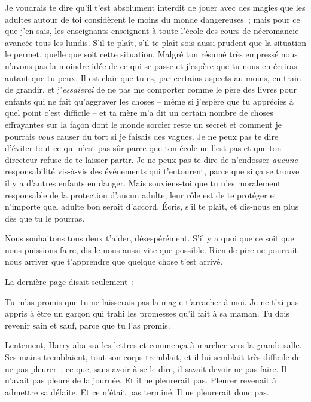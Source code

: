 \begin{writtenNote}
Je voudrais te dire qu'il t'est absolument interdit de jouer avec des magies que les adultes autour de toi considèrent le moins du monde dangereuses~; mais pour ce que j'en sais, les enseignants enseignent à toute l'école des cours de nécromancie avancée tous les lundis. S'il te plaît, s'il te plaît sois aussi prudent que la situation le permet, quelle que soit cette situation. Malgré ton résumé très empressé nous n'avons pas la moindre idée de ce qui se passe et j'espère que tu nous en écriras autant que tu peux. Il est clair que tu es, par certains aspects au moins, en train de grandir, et j'\emph{essaierai} de ne pas me comporter comme le père des livres pour enfants qui ne fait qu'aggraver les choses -- même si j'espère que tu apprécies à quel point c'est difficile -- et ta mère m'a dit un certain nombre de choses effrayantes sur la façon dont le monde sorcier reste un secret et comment je pourrais \emph{vous} causer du tort si je faisais des vagues. Je ne peux pas te dire d'éviter tout ce qui n'est pas sûr parce que ton école ne l'est pas et que ton directeur refuse de te laisser partir. Je ne peux pas te dire de n'endosser \emph{aucune} responsabilité vis-à-vis des événements qui t'entourent, parce que si ça se trouve il y a d'autres enfants en danger. Mais souviens-toi que tu n'es moralement responsable de la protection d'aucun adulte, leur rôle est de te protéger et n'importe quel adulte bon serait d'accord. Écris, s'il te plaît, et dis-nous en plus dès que tu le pourras.

Nous souhaitons tous deux t'aider, désespérément. S'il y a quoi que ce soit que nous puissions faire, dis-le-nous aussi vite que possible. Rien de pire ne pourrait nous arriver que t'apprendre que quelque chose t'est arrivé.

\end{writtenNote}

La dernière page disait seulement~:

\begin{writtenNote}
Tu m'as promis que tu ne laisserais pas la magie t'arracher à moi. Je ne t'ai pas appris à être un garçon qui trahi les promesses qu'il fait à sa maman. Tu dois revenir sain et sauf, parce que tu l'as promis.

\end{writtenNote}

Lentement, Harry abaissa les lettres et commença à marcher vers la grande salle. Ses mains tremblaient, tout son corps tremblait, et il lui semblait très difficile de ne pas pleurer~; ce que, sans avoir à se le dire, il savait devoir ne pas faire. Il n'avait pas pleuré de la journée. Et il ne pleurerait pas. Pleurer revenait à admettre sa défaite. Et ce n'était pas terminé. Il ne pleurerait donc pas.

